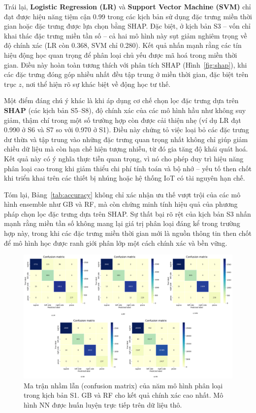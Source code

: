 Trái lại, \textbf{Logistic Regression (LR)} và \textbf{Support Vector Machine (SVM)} 
chỉ đạt được hiệu năng tiệm cận 0.99 trong các kịch bản sử dụng đặc trưng miền thời gian hoặc đặc trưng được lựa chọn bằng SHAP. 
Đặc biệt, ở kịch bản S3 – vốn chỉ khai thác đặc trưng miền tần số – cả hai mô hình này sụt giảm nghiêm trọng về độ chính xác (LR còn 0.368, SVM chỉ 0.280). 
Kết quả nhấn mạnh rằng các tín hiệu động học quan trọng để phân loại chủ yếu được mã hoá trong miền thời gian. 
Điều này hoàn toàn tương thích với phân tích SHAP (Hình~\ref{fig:shap}), 
khi các đặc trưng đóng góp nhiều nhất đều tập trung ở miền thời gian, đặc biệt trên trục $z$, 
nơi thể hiện rõ sự khác biệt về động học tư thế.

Một điểm đáng chú ý khác là khi áp dụng cơ chế chọn lọc đặc trưng dựa trên \textbf{SHAP} (các kịch bản S5–S8), 
độ chính xác của các mô hình hầu như không suy giảm, thậm chí trong một số trường hợp còn được cải thiện nhẹ 
(ví dụ LR đạt 0.990 ở S6 và S7 so với 0.970 ở S1). 
Điều này chứng tỏ việc loại bỏ các đặc trưng dư thừa và tập trung vào những đặc trưng quan trọng nhất 
không chỉ giúp giảm chiều dữ liệu mà còn hạn chế hiện tượng nhiễu, từ đó gia tăng độ khái quát hoá. 
Kết quả này có ý nghĩa thực tiễn quan trọng, vì nó cho phép duy trì hiệu năng phân loại cao 
trong khi giảm thiểu chi phí tính toán và bộ nhớ – yếu tố then chốt khi triển khai trên các thiết bị nhúng hoặc hệ thống IoT có tài nguyên hạn chế.

Tóm lại, Bảng~\ref{tab:accuracy} không chỉ xác nhận ưu thế vượt trội của các mô hình ensemble như GB và RF, 
mà còn chứng minh tính hiệu quả của phương pháp chọn lọc đặc trưng dựa trên SHAP. 
Sự thất bại rõ rệt của kịch bản S3 nhấn mạnh rằng miền tần số không mang lại giá trị phân loại đáng kể trong trường hợp này, 
trong khi các đặc trưng miền thời gian mới là nguồn thông tin then chốt để mô hình học được ranh giới phân lớp một cách chính xác và bền vững.




\begin{figure}[htbp]
    \centering
    \includegraphics[width=\linewidth]{images/matrix (2).png}
    \caption{Ma trận nhầm lẫn (confusion matrix) của năm mô hình 
    phân loại trong kịch bản S1. GB và RF cho kết quả chính xác 
    cao nhất. Mô hình NN được huấn luyện trực tiếp trên dữ liệu thô.}
    \label{fig:cm_all_models}
\end{figure}

